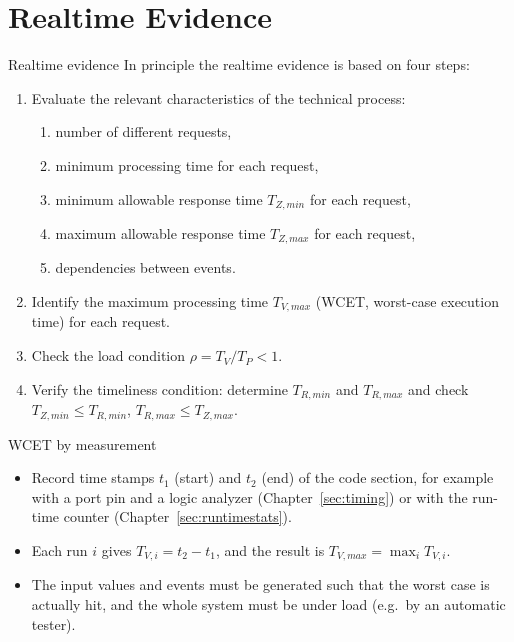 \section{Realtime Evidence}
\label{sec:evidence}

\begin{frame}{Realtime evidence}
  In principle the realtime evidence is based on four steps:
  \begin{enumerate}
    \item Evaluate the relevant characteristics of the technical process:
      \begin{enumerate}
        \item number of different requests,
        \item minimum processing time for each request,
        \item minimum allowable response time $T_{Z,min}$ for each request,
        \item maximum allowable response time $T_{Z,max}$ for each request,
        \item dependencies between events.
      \end{enumerate}
    \item Identify the maximum processing time $T_{V,max}$ (WCET, worst-case execution time) for each request.
    \item Check the load condition $\rho = T_V/T_P < 1$.
    \item Verify the timeliness condition: determine $T_{R,min}$ and $T_{R,max}$ and check $T_{Z,min} \le T_{R,min}$, $T_{R,max} \le T_{Z,max}$.
  \end{enumerate}
\end{frame}


\begin{frame}{WCET by measurement}
  \begin{itemize}
    \item Record time stamps $t_1$ (start) and $t_2$ (end) of the code section, for example with a port pin and a logic analyzer (Chapter~\ref{sec:timing}) or with the run-time counter (Chapter~\ref{sec:runtimestats}).
    \item Each run $i$ gives $T_{V,i} = t_2 - t_1$, and the result is $T_{V,max} = \max_i T_{V,i}$.
    \item The input values and events must be generated such that the worst case is actually hit, and the whole system must be under load (e.g.\ by an automatic tester).
  \end{itemize}
\end{frame}


